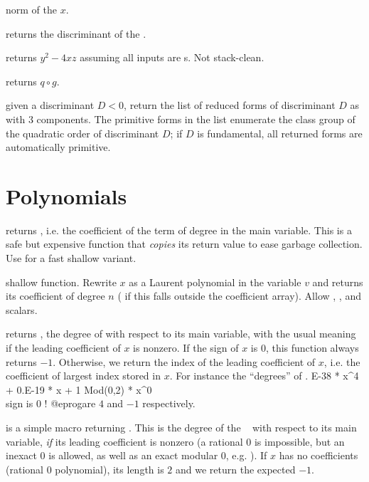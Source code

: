  norm of the  $x$.

 returns the discriminant of the 
.

 returns $y^2 - 4xz$ assuming all
inputs are s. Not stack-clean.

 returns $q \circ g$.

 given a discriminant $D < 0$, return the list
of reduced forms of discriminant $D$ as  with 3 components.
The primitive forms in the list enumerate the class group of the quadratic
order of discriminant $D$; if $D$ is fundamental, all returned forms
are automatically primitive.

\section{Polynomials}\label{se:polynomials}

 returns , i.e.
the coefficient of the term of degree  in the main variable. This is
a safe but expensive function that \emph{copies} its return value to ease
garbage collection. Use  for a fast shallow variant.

 shallow function. Rewrite
$x$ as a Laurent polynomial in the variable $v$ and returns its coefficient
of degree $n$ ( if this falls outside the coefficient array).
Allow , ,  and scalars.

 returns , the degree of
 with respect to its main variable, with the usual meaning if the
leading coefficient of $x$ is nonzero. If the sign of $x$ is $0$, this
function always returns $-1$. Otherwise, we return the index of the leading
coefficient of $x$, i.e. the coefficient of largest index stored in $x$.
For instance the ``degrees'' of
. E-38 * x^4 + 0.E-19 * x + 1
  Mod(0,2) * x^0    \\ sign is 0 !
@eprog\noindent are $4$ and $-1$ respectively.

 is a simple macro returning .
This is the degree of the ~ with respect to its main
variable, \emph{if} its leading coefficient is nonzero (a rational $0$ is
impossible, but an inexact $0$ is allowed, as well as an exact modular $0$,
e.g. ). If $x$ has no coefficients (rational $0$ polynomial),
its length is $2$ and we return the expected $-1$.

